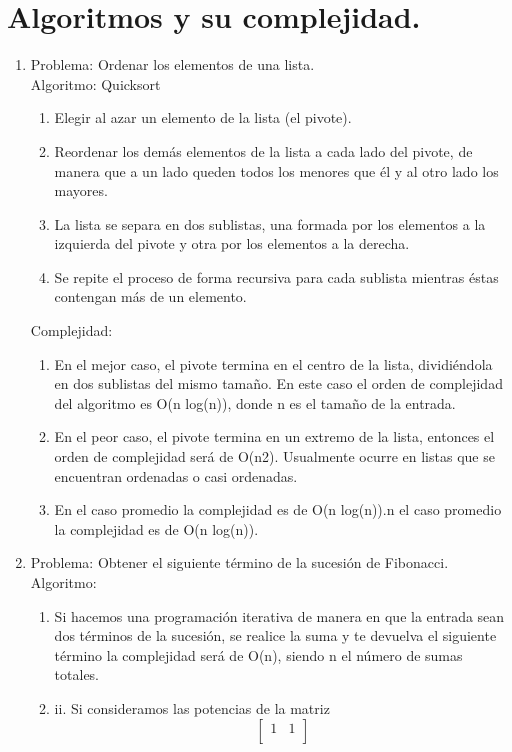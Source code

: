 \documentclass{article}
\begin{document}
\section*{Algoritmos y su complejidad.}
\begin{enumerate}
	\item Problema: Ordenar los elementos de una lista.\\Algoritmo: Quicksort
	\begin{enumerate}
		\item Elegir al azar un elemento de la lista (el pivote).
		\item Reordenar los demás elementos de la lista a cada lado del pivote, de manera que a un lado queden todos los menores que él y al otro lado los mayores.
		\item La lista se separa en dos sublistas, una formada por los elementos a la izquierda del pivote y otra por los elementos a la derecha. 
		\item Se repite el proceso de forma recursiva para cada sublista mientras éstas contengan más de un elemento. 
	\end{enumerate}
	Complejidad:
	\begin{enumerate}
		\item En el mejor caso, el pivote termina en el centro de la lista, dividiéndola en dos sublistas del mismo tamaño. En este caso el orden de complejidad del algoritmo es O(n log(n)), donde n es el tamaño de la entrada. 
		\item En el peor caso, el pivote termina en un extremo de la lista, entonces el orden de complejidad será de O(n2). Usualmente ocurre en listas que se encuentran ordenadas o casi ordenadas. 
		\item En el caso promedio la complejidad es de O(n log(n)).n el caso promedio la complejidad es de O(n log(n)).
	\end{enumerate}
	\item Problema: Obtener el siguiente término de la sucesión de Fibonacci.\\Algoritmo:
	\begin{enumerate}
		\item Si hacemos una programación iterativa de manera en que la entrada sean dos términos de la sucesión, se realice la suma y te devuelva el siguiente término la complejidad será de O(n), siendo n el número de sumas totales.
		\item ii. Si consideramos las potencias de la matriz 
		\[
		\begin{bmatrix}
			1 & 1 \\

\end{bmatrix}\]
\end{enumerate}
\end{enumerate}
\end{document}
